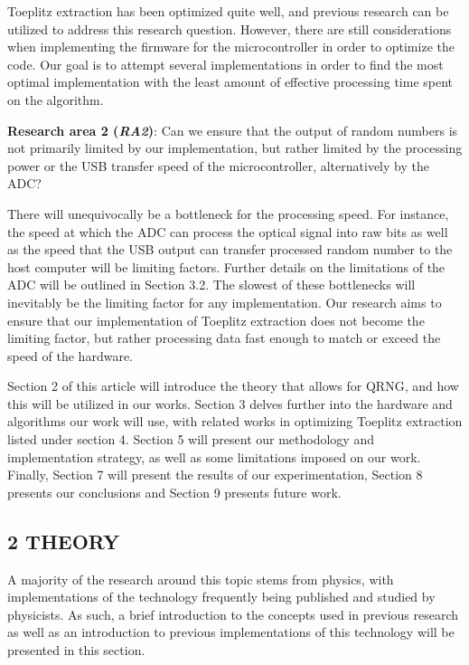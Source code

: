 Toeplitz extraction has been optimized quite well, and previous research can be utilized to address this research question. However, there are still considerations when implementing the firmware for the microcontroller in order to optimize the code. Our goal is to attempt several implementations in order to find the most optimal implementation with the least amount of effective processing time spent on the algorithm.

\textbf{Research area 2 (\emph{RA2})}: Can we ensure that the output of random numbers is not primarily limited by our implementation, but rather limited by the processing power or the USB transfer speed of the microcontroller, alternatively by the ADC?

There will unequivocally be a bottleneck for the processing speed. For instance, the speed at which the ADC can process the optical signal into raw bits as well as the speed that the USB output can transfer processed random number to the host computer will be limiting factors. Further details on the limitations of the ADC will be outlined in Section 3.2. The slowest of these bottlenecks will inevitably be the limiting factor for any implementation. Our research aims to ensure that our implementation of Toeplitz extraction does not become the limiting factor, but rather processing data fast enough to match or exceed the speed of the hardware.

Section 2 of this article will introduce the theory that allows for QRNG, and how this will be utilized in our works. Section 3 delves further into the hardware and algorithms our work will use, with related works in optimizing Toeplitz extraction listed under section 4. Section 5 will present our methodology and implementation strategy, as well as some limitations imposed on our work. Finally, Section 7 will present the results of our experimentation, Section 8 presents our conclusions and Section 9 presents future work.

\subsection{2 THEORY}\label{theory}

A majority of the research around this topic stems from physics, with implementations of the technology frequently being published and studied by physicists. As such, a brief introduction to the concepts used in previous research as well as an introduction to previous implementations of this technology will be presented in this section.

